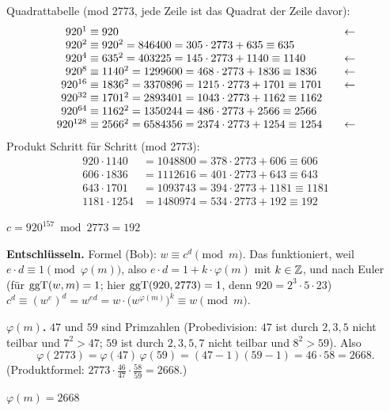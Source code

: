 Quadrattabelle (mod 2773, jede Zeile ist das Quadrat der Zeile davor):
\[
\begin{array}{r@{\;\equiv\;}l@{\qquad}l}
920^{1}   & 920 & \leftarrow\\
920^{2}   & 920^2 = 846400 = 305 \cdot 2773 + 635 \equiv 635 & \\
920^{4}   & 635^2 = 403225 = 145 \cdot 2773 + 1140 \equiv 1140 & \leftarrow\\
920^{8}   & 1140^2 = 1299600 = 468 \cdot 2773 + 1836 \equiv 1836 & \leftarrow\\
920^{16}  & 1836^2 = 3370896 = 1215 \cdot 2773 + 1701 \equiv 1701 & \leftarrow\\
920^{32}  & 1701^2 = 2893401 = 1043 \cdot 2773 + 1162 \equiv 1162 & \\
920^{64}  & 1162^2 = 1350244 = 486 \cdot 2773 + 2566 \equiv 2566 & \\
920^{128} & 2566^2 = 6584356 = 2374 \cdot 2773 + 1254 \equiv 1254 & \leftarrow
\end{array}
\]
Produkt Schritt für Schritt (mod 2773):
\begin{align*}
920 \cdot 1140 &= 1048800 = 378 \cdot 2773 + 606 \equiv 606\\
606 \cdot 1836 &= 1112616 = 401 \cdot 2773 + 643 \equiv 643\\
643 \cdot 1701 &= 1093743 = 394 \cdot 2773 + 1181 \equiv 1181\\
1181 \cdot 1254 &= 1480974 = 534 \cdot 2773 + 192 \equiv 192
\end{align*}
\begin{ergebnis} $c = 920^{157} \bmod 2773 = 192$ \end{ergebnis}

 \textbf{Entschlüsseln.} Formel (Bob): $w \equiv c^d \pmod m$.
Das funktioniert, weil $e \cdot d \equiv 1 \pmod{\varphi(m)}$, also $e \cdot d = 1 + k \cdot \varphi(m)$ mit $k \in \mathbb{Z}$, und nach Euler
(für $\operatorname{ggT}(w, m) = 1$; hier $\operatorname{ggT}(920, 2773) = 1$, denn $920 = 2^3 \cdot 5 \cdot 23$)
$c^d \equiv (w^e)^d = w^{ed} = w \cdot \bigl(w^{\varphi(m)}\bigr)^k \equiv w \pmod m$.

 \textbf{$\varphi(m)$.} $47$ und $59$ sind Primzahlen (Probedivision: $47$ ist durch $2, 3, 5$ nicht teilbar und $7^2 > 47$;
$59$ ist durch $2, 3, 5, 7$ nicht teilbar und $8^2 > 59$). Also
\[
\varphi(2773) = \varphi(47)\,\varphi(59) = (47 - 1)(59 - 1) = 46 \cdot 58 = 2668 .
\]
(Produktformel: $2773 \cdot \tfrac{46}{47} \cdot \tfrac{58}{59} = 2668$.)
\begin{ergebnis} $\varphi(m) = 2668$ \end{ergebnis}


